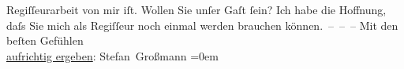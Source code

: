 \begin{ledgroupsized}[t]{13cm}
               Regiſſeurarbeit von mir iſt. Wollen Sie unſer Gaſt ſein?\pend
           \pstart
           Ich habe die Hoffnung, daſs Sie mich als Regiſſeur noch einmal werden brauchen
               können. – – –\pend
           \pstart
           Mit den beſten Gefühlen{\\[\baselineskip]}\uline{aufrichtig ergeben}:
                  \spacefill\mbox{Stefan Großmann}\pend
           \leftskip=0em{}          \endnumbering{}\end{ledgroupsized}  \newcommand{\dateiname}{L01920}\newcommand{\titel}{Stefan Großmann an Arthur Schnitzler, 31. 3. 1910}\newcommand{\editorInnen}{ Martin Anton Müller und Gerd-Hermann Susen}
      